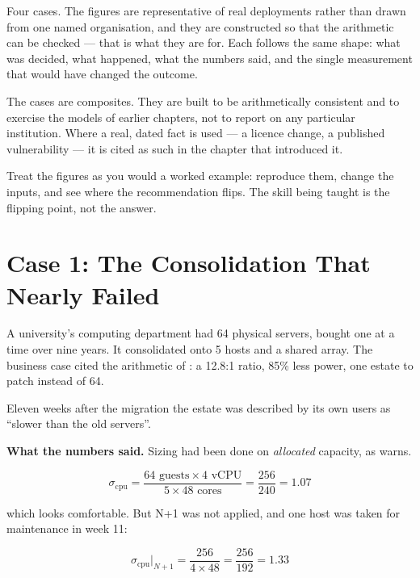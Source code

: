 Four cases. The figures are representative of real deployments rather than
drawn from one named organisation, and they are constructed so that the
arithmetic can be checked --- that is what they are for. Each follows the same
shape: what was decided, what happened, what the numbers said, and the single
measurement that would have changed the outcome.

\begin{alertbox}
The cases are composites. They are built to be arithmetically consistent and to
exercise the models of earlier chapters, not to report on any particular
institution. Where a real, dated fact is used --- a licence change, a published
vulnerability --- it is cited as such in the chapter that introduced it.

\smallskip
Treat the figures as you would a worked example: reproduce them, change the
inputs, and see where the recommendation flips. The skill being taught is the
flipping point, not the answer.
\end{alertbox}

\section{Case 1: The Consolidation That Nearly Failed}

\begin{conceptbox}
A university's computing department had 64 physical servers, bought one at a
time over nine years. It consolidated onto 5 hosts and a shared array. The
business case cited the arithmetic of : a 12.8:1 ratio, 85\% less
power, one estate to patch instead of 64.

\smallskip
Eleven weeks after the migration the estate was described by its own users as
``slower than the old servers''.
\end{conceptbox}

\textbf{What the numbers said.} Sizing had been done on \emph{allocated}
capacity, as  warns.

\[ \sigma_{\text{cpu}} = \frac{64 \text{ guests} \times 4 \text{ vCPU}}
   {5 \times 48 \text{ cores}} = \frac{256}{240} = 1.07 \]

which looks comfortable. But N+1 was not applied, and one host was taken for
maintenance in week 11:

\[ \sigma_{\text{cpu}}\big|_{N+1} = \frac{256}{4 \times 48} = \frac{256}{192}
   = 1.33 \]

